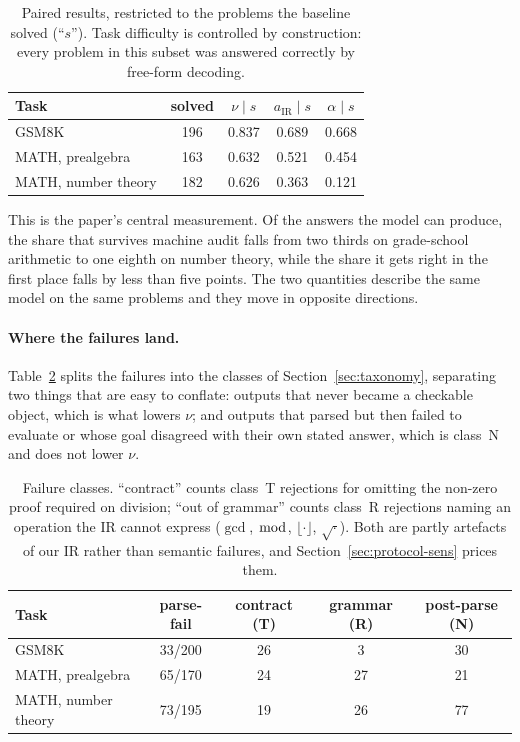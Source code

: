 \documentclass[11pt,a4paper]{article}
\begin{document}
\begin{table}[t]
\centering
\caption{Paired results, restricted to the problems the baseline solved
(``$s$'').  Task difficulty is controlled by construction: every problem in this
subset was answered correctly by free-form decoding.}
\label{tab:paired}
\begin{tabular}{@{}lcccc@{}}
\toprule
Task & solved & $\nu \mid s$ & $a_{\mathrm{IR}} \mid s$ & $\alpha \mid s$ \\
\midrule
GSM8K               & 196 & 0.837 & 0.689 & 0.668 \\
MATH, prealgebra    & 163 & 0.632 & 0.521 & 0.454 \\
MATH, number theory & 182 & 0.626 & 0.363 & 0.121 \\
\bottomrule
\end{tabular}
\end{table}

This is the paper's central measurement.  Of the answers the model can produce,
the share that survives machine audit falls from two thirds on grade-school
arithmetic to one eighth on number theory, while the share it gets right in the
first place falls by less than five points.  The two quantities describe the same
model on the same problems and they move in opposite directions.

\paragraph{Where the failures land.}
Table~\ref{tab:classes} splits the failures into the classes of
Section~\ref{sec:taxonomy}, separating two things that are easy to conflate:
outputs that never became a checkable object, which is what lowers $\nu$; and
outputs that parsed but then failed to evaluate or whose goal disagreed with
their own stated answer, which is class~N and does not lower $\nu$.

\begin{table}[t]
\centering
\caption{Failure classes.  ``contract'' counts class~T rejections for omitting
the non-zero proof required on division; ``out of grammar'' counts class~R
rejections naming an operation the IR cannot express ($\gcd$, $\bmod$,
$\lfloor\cdot\rfloor$, $\sqrt{\cdot}$).  Both are partly artefacts of our IR
rather than semantic failures, and Section~\ref{sec:protocol-sens} prices them.}
\label{tab:classes}
\small
\begin{tabular}{@{}lcccc@{}}
\toprule
Task & parse-fail & contract (T) & grammar (R) & post-parse (N) \\
\midrule
GSM8K               & 33/200 & 26 &  3 & 30 \\
MATH, prealgebra    & 65/170 & 24 & 27 & 21 \\
MATH, number theory & 73/195 & 19 & 26 & 77 \\
\bottomrule
\end{tabular}
\end{table}
\end{document}

